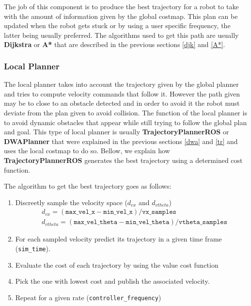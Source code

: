 The job of this component is to produce the best trajectory for a robot to take with the amount of information given by the global costmap.
This plan can be updated when the robot gets stuck or by using a user specific frequency, the latter being usually preferred. The algorithms used to get this path are usually \textbf{Dijkstra} or \textbf{A*} that are described in the previous sections \ref{djk} and \ref{A*}.

\subsubsection{Local Planner}
The local planner takes into account the trajectory given by the global planner and tries to compute velocity commands that follow it. However the path given may be to close to an obstacle detected and in order to avoid it the robot must deviate from the plan given to avoid collision. The function of the local planner is to avoid dynamic obstacles that appear while still trying to follow the global plan and goal. This type of local planner is usually \textbf{TrajectoryPlannerROS} or \textbf{DWAPlanner} that were explained in the previous sections \ref{dwa} and \ref{tr} and uses the local costmap to do so. Bellow, we explain how \textbf{TrajectoryPlannerROS} generates the best trajectory using a determined cost function.

The algorithm to get the best trajectory goes as follows:
\begin{enumerate}
    \item Discreetly sample the velocity space ($d_{vx}$ and $d_{vtheta}$)
    \begin{align*}
        & d_{vx}=(\texttt{max\_vel\_x}-\texttt{min\_vel\_x})/\texttt{vx\_samples}\\
         & d_{vtheta}=(\texttt{max\_vel\_theta}-\texttt{min\_vel\_theta})/\texttt{vtheta\_samples}
    \end{align*}
    \item For each sampled velocity predict its trajectory in a given time frame (\texttt{sim\_time}).
    \item Evaluate the cost of each trajectory  by using the value cost function
    \item Pick the one with lowest cost and publish the associated velocity.
    \item Repeat for a given rate (\texttt{controller\_frequency})
\end{enumerate}


